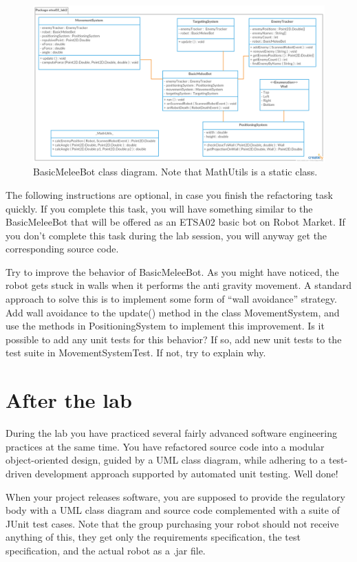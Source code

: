 \documentclass{scrreprt}
\begin{document}
\begin{figure}
\centering
\includegraphics[width=1.1\textwidth]{figures/BasicMeleeBotClassDiagram.png}
\caption{BasicMeleeBot class diagram. Note that MathUtils is a static class.}
\label{fig:classDiagram}
\end{figure}

\newpage

The following instructions are optional, in case you finish the refactoring task quickly. If you complete this task, you will have something similar to the BasicMeleeBot that will be offered as an ETSA02 basic bot on Robot Market. If you don't complete this task during the lab session, you will anyway get the corresponding source code.

Try to improve the behavior of BasicMeleeBot. As you might have noticed, the robot gets stuck in walls when it performs the anti gravity movement. A standard approach to solve this is to implement some form of ``wall avoidance'' strategy. Add wall avoidance to the update() method in the class MovementSystem, and use the methods in PositioningSystem to implement this improvement. Is it possible to add any unit tests for this behavior? If so, add new unit tests to the test suite in MovementSystemTest. If not, try to explain why.

\chapter{After the lab}
During the lab you have practiced several fairly advanced software engineering practices at the same time. You have refactored source code into a modular object-oriented design, guided by a UML class diagram, while adhering to a test-driven development approach supported by automated unit testing. Well done!

When your project releases software, you are supposed to provide the regulatory body with a UML class diagram and source code complemented with a suite of JUnit test cases. Note that the group purchasing your robot should not receive anything of this, they get only the requirements specification, the test specification, and the actual robot as a .jar file.
\end{document}
